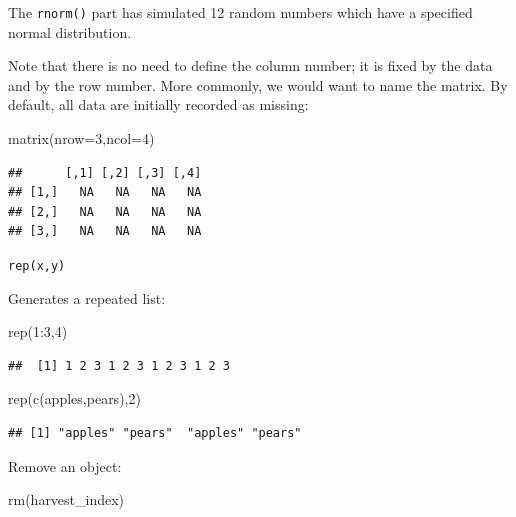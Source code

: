 \documentclass[
]{book}
\newenvironment{Shaded}{\begin{snugshade}}{\end{snugshade}}
\newcommand{\AttributeTok}[1]{\textcolor[rgb]{0.77,0.63,0.00}{#1}}
\newcommand{\DecValTok}[1]{\textcolor[rgb]{0.00,0.00,0.81}{#1}}
\newcommand{\FunctionTok}[1]{\textcolor[rgb]{0.00,0.00,0.00}{#1}}
\newcommand{\NormalTok}[1]{#1}
\newcommand{\SpecialCharTok}[1]{\textcolor[rgb]{0.00,0.00,0.00}{#1}}
\newcommand{\StringTok}[1]{\textcolor[rgb]{0.31,0.60,0.02}{#1}}
\begin{document}
The \texttt{rnorm()} part has simulated 12 random numbers which have a specified normal distribution.

Note that there is no need to define the column number; it is fixed by the data and by the row number. More commonly, we would want to name the matrix. By default, all data are initially recorded as missing:

\begin{Shaded}
\begin{Highlighting}[]
\FunctionTok{matrix}\NormalTok{(}\AttributeTok{nrow=}\DecValTok{3}\NormalTok{,}\AttributeTok{ncol=}\DecValTok{4}\NormalTok{)}
\end{Highlighting}
\end{Shaded}

\begin{verbatim}
##      [,1] [,2] [,3] [,4]
## [1,]   NA   NA   NA   NA
## [2,]   NA   NA   NA   NA
## [3,]   NA   NA   NA   NA
\end{verbatim}

\texttt{rep(x,y)}

Generates a repeated list:

\begin{Shaded}
\begin{Highlighting}[]
\FunctionTok{rep}\NormalTok{(}\DecValTok{1}\SpecialCharTok{:}\DecValTok{3}\NormalTok{,}\DecValTok{4}\NormalTok{)}
\end{Highlighting}
\end{Shaded}

\begin{verbatim}
##  [1] 1 2 3 1 2 3 1 2 3 1 2 3
\end{verbatim}

\begin{Shaded}
\begin{Highlighting}[]
\FunctionTok{rep}\NormalTok{(}\FunctionTok{c}\NormalTok{(}\StringTok{\textquotesingle{}apples\textquotesingle{}}\NormalTok{,}\StringTok{\textquotesingle{}pears\textquotesingle{}}\NormalTok{),}\DecValTok{2}\NormalTok{)}
\end{Highlighting}
\end{Shaded}

\begin{verbatim}
## [1] "apples" "pears"  "apples" "pears"
\end{verbatim}

Remove an object:

\begin{Shaded}
\begin{Highlighting}[]
\FunctionTok{rm}\NormalTok{(harvest\_index)}
\end{Highlighting}
\end{Shaded}
\end{document}
